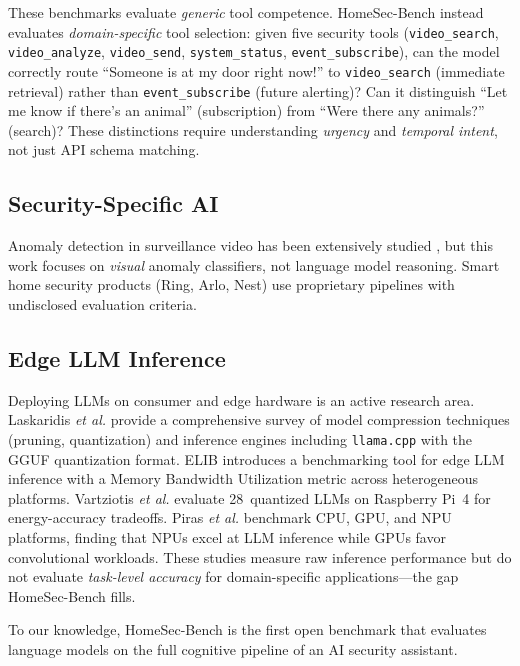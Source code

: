 \documentclass[onecolumn,10pt]{IEEEtran}
\begin{document}
These benchmarks evaluate \emph{generic} tool competence. HomeSec-Bench
instead evaluates \emph{domain-specific} tool selection: given five
security tools (\texttt{video\_search}, \texttt{video\_analyze},
\texttt{video\_send}, \texttt{system\_status}, \texttt{event\_subscribe}),
can the model correctly route ``Someone is at my door right now!'' to
\texttt{video\_search} (immediate retrieval) rather than
\texttt{event\_subscribe} (future alerting)? Can it distinguish ``Let me
know if there's an animal'' (subscription) from ``Were there any
animals?'' (search)? These distinctions require understanding
\emph{urgency} and \emph{temporal intent}, not just API schema matching.

\subsection{Security-Specific AI}
Anomaly detection in surveillance video has been extensively studied
\cite{sultani2018realworld}, but this work focuses on \emph{visual}
anomaly classifiers, not language model reasoning. Smart home security
products (Ring, Arlo, Nest) use proprietary pipelines with undisclosed
evaluation criteria.

\subsection{Edge LLM Inference}
Deploying LLMs on consumer and edge hardware is an active research area.
Laskaridis \textit{et al.} \cite{laskaridis2024llmedge} provide a
comprehensive survey of model compression techniques (pruning,
quantization) and inference engines including \texttt{llama.cpp} with
the GGUF quantization format. ELIB \cite{lai2025elib} introduces
a benchmarking tool for edge LLM inference with a Memory Bandwidth
Utilization metric across heterogeneous platforms. Vartziotis
\textit{et al.} \cite{vartziotis2025sustainable} evaluate 28~quantized
LLMs on Raspberry Pi~4 for energy-accuracy tradeoffs. Piras
\textit{et al.} \cite{piras2024npubench} benchmark CPU, GPU, and NPU
platforms, finding that NPUs excel at LLM inference while GPUs favor
convolutional workloads. These studies measure raw inference
performance but do not evaluate \emph{task-level accuracy}
for domain-specific applications---the gap HomeSec-Bench fills.

To our knowledge, HomeSec-Bench is the first
open benchmark that evaluates language models on the full cognitive
pipeline of an AI security assistant.
\end{document}
